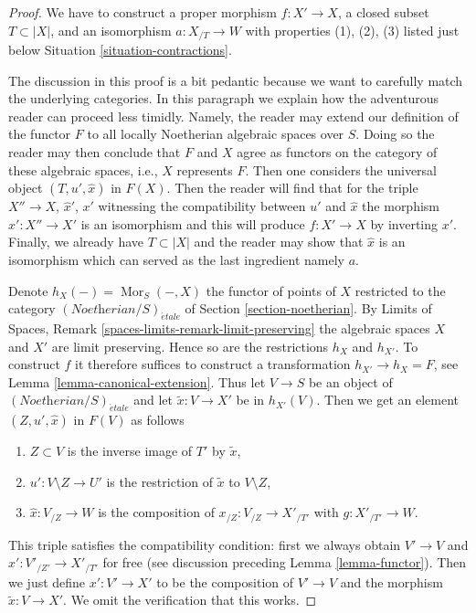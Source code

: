 \documentclass{stacks-project}
\theoremstyle{plain}
\theoremstyle{definition}
\theoremstyle{remark}
\numberwithin{equation}{subsection}
\def\Mor{\mathop{\mathrm{Mor}}\nolimits}
\def\etale{{\acute{e}tale}}
\begin{document}
\begin{proof}
We have to construct a proper morphism $f : X' \to X$, a closed subset
$T \subset |X|$, and an isomorphism $a : X_{/T} \to W$ with properties
(1), (2), (3) listed just below Situation \ref{situation-contractions}.

\medskip\noindent
The discussion in this proof is a bit pedantic because we want
to carefully match the underlying categories. In this paragraph
we explain how the adventurous reader can proceed less timidly.
Namely, the reader may extend our definition of the functor $F$
to all locally Noetherian algebraic spaces over $S$.
Doing so the reader may then conclude that $F$ and $X$ agree as
functors on the category of these algebraic spaces, i.e.,
$X$ represents $F$. Then one considers the universal object
$(T, u', \hat x)$ in $F(X)$. Then the reader will find that
for the triple $X'' \to X$, $\hat x'$, $x'$ witnessing the compatibility
between $u'$ and $\hat x$ the morphism $x' : X'' \to X'$ is an isomorphism
and this will produce $f : X' \to X$ by inverting $x'$. Finally, we already
have $T \subset |X|$ and the reader may show that $\hat x$ is an isomorphism
which can served as the last ingredient namely $a$.

\medskip\noindent
Denote $h_X(-) = \Mor_S(-, X)$ the functor of
points of $X$ restricted to the category
$(\textit{Noetherian}/S)_\etale$ of Section \ref{section-noetherian}.
By Limits of Spaces, Remark \ref{spaces-limits-remark-limit-preserving}
the algebraic spaces $X$ and $X'$ are limit preserving. Hence so
are the restrictions $h_X$ and $h_{X'}$.
To construct $f$ it therefore suffices to construct a
transformation $h_{X'} \to h_X = F$, see Lemma \ref{lemma-canonical-extension}.
Thus let $V \to S$ be an object of $(\textit{Noetherian}/S)_\etale$
and let $\tilde x : V \to X'$ be in $h_{X'}(V)$.
Then we get an element $(Z, u', \hat x)$ in $F(V)$ as follows
\begin{enumerate}
\item $Z \subset V$ is the inverse image of $T'$ by $\tilde x$,
\item $u' : V \setminus Z \to U'$ is the restriction of
$\tilde x$ to $V \setminus Z$,
\item $\hat x : V_{/Z} \to W$ is the composition of
$x_{/Z} : V_{/Z} \to X'_{/T'}$ with $g : X'_{/T'} \to W$.
\end{enumerate}
This triple satisfies the compatibility condition: first we always
obtain $V' \to V$ and $\hat x' : V'_{/Z'} \to X'_{/T'}$ for free
(see discussion preceding Lemma \ref{lemma-functor}).
Then we just define $x' : V' \to X'$ to be the composition
of $V' \to V$ and the morphism $\tilde x : V \to X'$.
We omit the verification that this works.


\end{proof}
\end{document}
